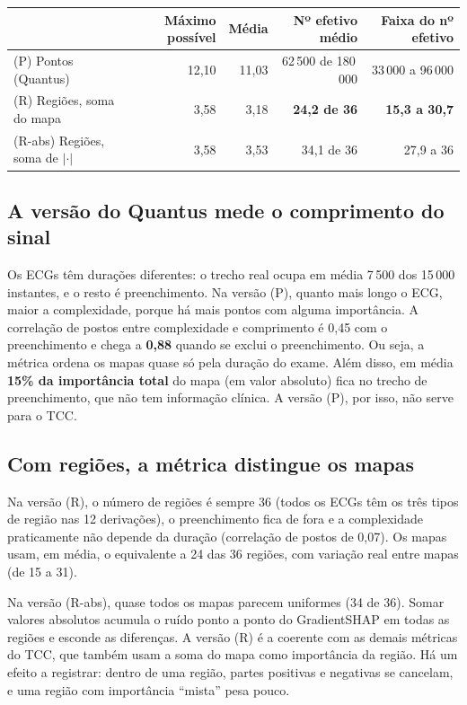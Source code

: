 \documentclass[11pt,a4paper]{article}
\begin{document}
\begin{center}\small
\begin{tabularx}{\linewidth}{Xrrrr}
\toprule
& \textbf{Máximo possível} & \textbf{Média} & \textbf{Nº efetivo médio} & \textbf{Faixa do nº efetivo} \\
\midrule
(P) Pontos (Quantus) & 12,10 & 11,03 & 62\,500 de 180\,000 & 33\,000 a 96\,000 \\
(R) Regiões, soma do mapa & 3,58 & 3,18 & \textbf{24,2 de 36} & \textbf{15,3 a 30,7} \\
(R-abs) Regiões, soma de $|\cdot|$ & 3,58 & 3,53 & 34,1 de 36 & 27,9 a 36 \\
\bottomrule
\end{tabularx}
\end{center}

\subsection{A versão do Quantus mede o comprimento do sinal}\label{sec:pontos}
Os ECGs têm durações diferentes: o trecho real ocupa em média 7\,500 dos 15\,000 instantes, e o resto é preenchimento. Na versão (P), quanto mais longo o ECG, maior a complexidade, porque há mais pontos com alguma importância. A correlação de postos entre complexidade e comprimento é 0,45 com o preenchimento e chega a \textbf{0,88} quando se exclui o preenchimento. Ou seja, a métrica ordena os mapas quase só pela duração do exame. Além disso, em média \textbf{15\% da importância total} do mapa (em valor absoluto) fica no trecho de preenchimento, que não tem informação clínica. A versão (P), por isso, não serve para o TCC.

\subsection{Com regiões, a métrica distingue os mapas}\label{sec:regioes}
Na versão (R), o número de regiões é sempre 36 (todos os ECGs têm os três tipos de região nas 12 derivações), o preenchimento fica de fora e a complexidade praticamente não depende da duração (correlação de postos de 0,07). Os mapas usam, em média, o equivalente a 24 das 36 regiões, com variação real entre mapas (de 15 a 31).

Na versão (R-abs), quase todos os mapas parecem uniformes (34 de 36). Somar valores absolutos acumula o ruído ponto a ponto do GradientSHAP em todas as regiões e esconde as diferenças. A versão (R) é a coerente com as demais métricas do TCC, que também usam a soma do mapa como importância da região. Há um efeito a registrar: dentro de uma região, partes positivas e negativas se cancelam, e uma região com importância “mista” pesa pouco.
\end{document}
